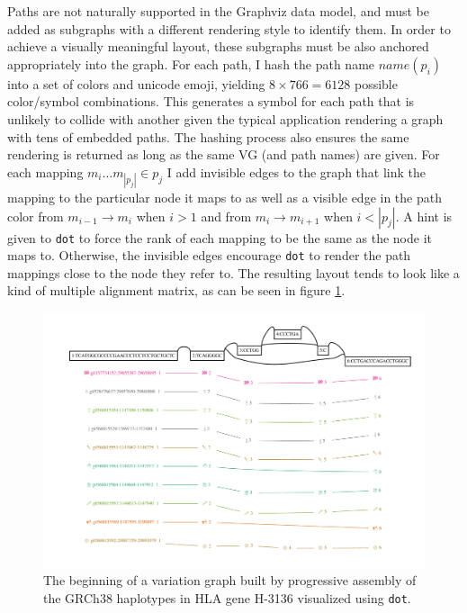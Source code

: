 Paths are not naturally supported in the Graphviz data model, and must be added as subgraphs with a different rendering style to identify them.
In order to achieve a visually meaningful layout, these subgraphs must be also anchored appropriately into the graph.
For each path, I hash the path name $name(p_i)$ into a set of colors and unicode emoji, yielding $8 \times 766 = 6128$ possible color/symbol combinations.
This generates a symbol for each path that is unlikely to collide with another given the typical application rendering a graph with tens of embedded paths.
The hashing process also ensures the same rendering is returned as long as the same VG (and path names) are given.
For each mapping $m_i\ldots m_{|p_j|} \in p_j$ I add invisible edges to the graph that link the mapping to the particular node it maps to as well as a visible edge in the path color from $m_{i-1} \to m_i$ when $i > 1$ and from $m_i \to m_{i+1}$ when $i < |p_j|$.
A hint is given to {\tt dot} to force the rank of each mapping to be the same as the node it maps to.
Otherwise, the invisible edges encourage {\tt dot} to render the path mappings close to the node they refer to.
The resulting layout tends to look like a kind of multiple alignment matrix, as can be seen in figure \ref{fig:vg_view_dot}.

\begin{figure}[htbp!] 
\centering    
\includegraphics[width=1.0\textwidth]{Chapter2/Figs/Vector/vg_view_dp_H-3136_dot.pdf}
\caption{The beginning of a variation graph built by progressive assembly of the GRCh38 haplotypes in HLA gene H-3136 visualized using {\tt dot}.}
\label{fig:vg_view_dot}
\end{figure}

